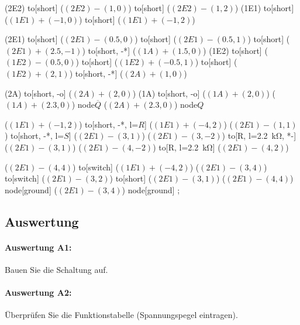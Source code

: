 \documentclass[a4paper,titlepage,parskip]{scrreprt}
\begin{document}
\begin{center}
\begin{circuitikz}[scale=1]
                (2E2) to[short] ($(2E2) - (1,0)$)
                      to[short]	($(2E2) - (1,2)$)
                (1E1) to[short] ($(1E1) + (-1,0)$)
                      to[short]	($(1E1) + (-1,2)$)
                      
                (2E1) to[short] ($(2E1) - (0.5,0)$)
                      to[short] ($(2E1) - (0.5,1)$)
                      to[short] ($(2E1) + (2.5,-1)$)
                      to[short, -*] ($(1A) + (1.5,0)$)
                (1E2) to[short] ($(1E2) - (0.5,0)$)
                      to[short] ($(1E2) + (-0.5,1)$)
                      to[short] ($(1E2) + (2,1)$)
                      to[short, -*] ($(2A) + (1,0)$)
                      
                (2A) to[short, -o] ($(2A) + (2,0)$) 
                (1A) to[short, -o] ($(1A) + (2,0)$)
                ($(1A) + (2.3,0)$) node{$\overline{Q}$}
                ($(2A) + (2.3,0)$) node{$Q$}
                
                
                ($(1E1) + (-1,2)$) to[short, -*, l=$R$] ($(1E1) + (-4,2)$)
                ($(2E1) - (1,1)$) to[short, -*, l=$S$] ($(2E1) - (3,1)$)
                ($(2E1) - (3,-2)$) to[R, l=\SI{2,2}{\kilo\ohm}, *-] ($(2E1) - (3,1)$)
                ($(2E1) - (4,-2)$) to[R, l=\SI{2,2}{\kilo\ohm}] ($(2E1) - (4,2)$)
                
                ($(2E1) - (4,4)$) to[switch] ($(1E1) + (-4,2)$)
                ($(2E1) - (3,4)$) to[switch] ($(2E1) - (3,2)$)
                                  to[short] ($(2E1) - (3,1)$)
                ($(2E1) - (4,4)$)  node[ground]{}
                ($(2E1) - (3,4)$)  node[ground]{}
                ;
            \end{circuitikz}
        \end{center}
      \subsection{Auswertung}
        \paragraph{Auswertung A1:} Bauen Sie die Schaltung auf.

        \paragraph{Auswertung A2:} Überprüfen Sie die Funktionstabelle (Spannungspegel eintragen).
\end{document}
